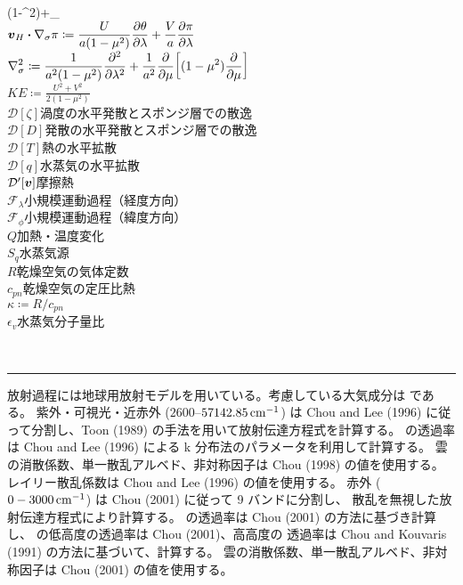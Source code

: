 \documentclass[body]{subfiles}
\begin{document}
\begin{table}[t]
\begin{minipage}{\textwidth}
\begin{minipage}{.5\textwidth}
\begin{tabbing}
					(1-\mu^2)\pdv{\pi}{\mu}+_\phi\cos\phi\)\\
				\(\displaystyle\vb*{v}_H\vdot\nabla_\sigma\pi\coloneqq
					\frac{U}{a(1-\mu^2)}\pdv{\theta}{\lambda}+\frac{V}{a}\pdv{\pi}{\lambda}\)\\
				\(\displaystyle\nabla_\sigma^2\coloneqq\frac{1}{a^2(1-\mu^2)}\pdv[2]{}{\lambda}
					+\frac{1}{a^2}\pdv{}{\mu}\qty[(1-\mu^2)\pdv{}{\mu}]\)\\
				\(\displaystyle KE\coloneqq\frac{U^2+V^2}{2(1-\mu^2)}\)\\
				\(\mathcal{D}[\zeta]\)\>渦度の水平発散とスポンジ層での散逸\\
				\(\mathcal{D}[D]\)\>発散の水平発散とスポンジ層での散逸\\
				\(\mathcal{D}[T]\)\>熱の水平拡散\\
				\(\mathcal{D}[q]\)\>水蒸気の水平拡散\\
				\(\mathcal{D}'[\vb*{v}]\)\>摩擦熱\\
				\(\mathcal{F}_\lambda\)\>小規模運動過程（経度方向）\\
				\(\mathcal{F}_\phi\)\>小規模運動過程（緯度方向）\\
				\(Q\)\>加熱・温度変化\\
				\(S_q\)\>水蒸気源\\
				\(R\)\>乾燥空気の気体定数\\
				\(c_{pn}\)\>乾燥空気の定圧比熱\\
				\(\kappa\coloneqq R/c_{pn}\)\\
				\(\epsilon_v\)\>水蒸気分子量比
			\end{tabbing}
		\end{minipage}\\
		\rule[0pt]{\textwidth}{\heavyrulewidth}
	\end{minipage}
\end{table}

放射過程には地球用放射モデルを用いている。考慮している大気成分は  である。
紫外・可視光・近赤外 (\(2600\)--\(57142.85\hmu{cm^{-1}}\))
は Chou and Lee (1996) に従って分割し、Toon \etal (1989) の手法を用いて放射伝達方程式を計算する。
 の透過率は Chou and Lee (1996) による k 分布法のパラメータを利用して計算する。
雲の消散係数、単一散乱アルベド、非対称因子は Chou \etal (1998) の値を使用する。
レイリー散乱係数は Chou and Lee (1996) の値を使用する。
赤外 (\(0-3000\hmu{cm^{-1}}\)) は Chou \etal (2001) に従って 9 バンドに分割し、
散乱を無視した放射伝達方程式により計算する。 の透過率は Chou \etal (2001)
の方法に基づき計算し、 の低高度の透過率は Chou \etal (2001)、高高度の
透過率は Chou and Kouvaris (1991) の方法に基づいて、計算する。
雲の消散係数、単一散乱アルベド、非対称因子は Chou \etal (2001) の値を使用する。
\end{document}

